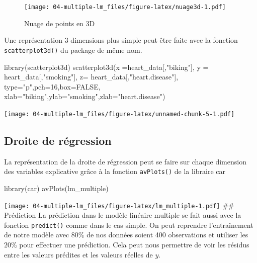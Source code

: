 \documentclass[
]{book}
\newenvironment{Shaded}{\begin{snugshade}}{\end{snugshade}}
\newcommand{\AttributeTok}[1]{\textcolor[rgb]{0.77,0.63,0.00}{#1}}
\newcommand{\ConstantTok}[1]{\textcolor[rgb]{0.00,0.00,0.00}{#1}}
\newcommand{\DecValTok}[1]{\textcolor[rgb]{0.00,0.00,0.81}{#1}}
\newcommand{\FunctionTok}[1]{\textcolor[rgb]{0.00,0.00,0.00}{#1}}
\newcommand{\NormalTok}[1]{#1}
\newcommand{\StringTok}[1]{\textcolor[rgb]{0.31,0.60,0.02}{#1}}
\begin{document}
\begin{figure}
\centering
\texttt{[image: 04-multiple-lm\_files/figure-latex/nuage3d-1.pdf]}
\caption{\label{fig:nuage3d}Nuage de points en 3D}
\end{figure}

Une représentation 3 dimensions plus simple peut être faite avec la fonction \texttt{scatterplot3d()} du package de même nom.

\begin{Shaded}
\begin{Highlighting}[]
\FunctionTok{library}\NormalTok{(scatterplot3d)}
\FunctionTok{scatterplot3d}\NormalTok{(}\AttributeTok{x =}\NormalTok{heart\_data[,}\StringTok{"biking"}\NormalTok{],}
                         \AttributeTok{y =}\NormalTok{ heart\_data[,}\StringTok{"smoking"}\NormalTok{],}
                         \AttributeTok{z=}\NormalTok{ heart\_data[,}\StringTok{"heart.disease"}\NormalTok{], }\AttributeTok{type=}\StringTok{"p"}\NormalTok{,}\AttributeTok{pch=}\DecValTok{16}\NormalTok{,}\AttributeTok{box=}\ConstantTok{FALSE}\NormalTok{,}
                         \AttributeTok{xlab=}\StringTok{"biking"}\NormalTok{,}\AttributeTok{ylab=}\StringTok{"smoking"}\NormalTok{,}\AttributeTok{zlab=}\StringTok{"heart.disease"}\NormalTok{)}
\end{Highlighting}
\end{Shaded}

\texttt{[image: 04-multiple-lm\_files/figure-latex/unnamed-chunk-5-1.pdf]}

\hypertarget{droite-de-ruxe9gression}{%
\subsection{Droite de régression}\label{droite-de-ruxe9gression}}

La représentation de la droite de régression peut se faire sur chaque dimension des variables explicative grâce à la fonction \texttt{avPlots()} de la libraire car

\begin{Shaded}
\begin{Highlighting}[]
\FunctionTok{library}\NormalTok{(car)}
\FunctionTok{avPlots}\NormalTok{(lm\_multiple)}
\end{Highlighting}
\end{Shaded}

\texttt{[image: 04-multiple-lm\_files/figure-latex/lm\_multiple-1.pdf]}
\#\# Prédiction
La prédiction dans le modèle linéaire multiple se fait aussi avec la fonction \texttt{predict()} comme dans le cas simple. On peut reprendre l'entraînement de notre modèle avec \(80\%\) de nos données soient 400 observations et utiliser les \(20\%\) pour effectuer une prédiction. Cela peut nous permettre de voir les résidus entre les valeurs prédites et les valeurs réelles de \(y\).
\end{document}
